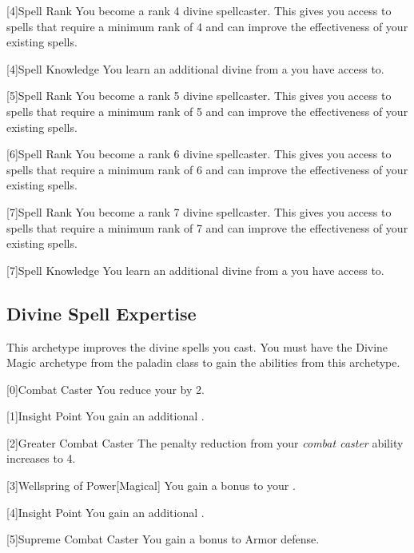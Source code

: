         [4]{Spell Rank} You become a rank 4 divine spellcaster.
        This gives you access to spells that require a minimum rank of 4 and can improve the effectiveness of your existing spells.

        [4]{Spell Knowledge} You learn an additional divine  from a  you have access to.

        [5]{Spell Rank} You become a rank 5 divine spellcaster.
        This gives you access to spells that require a minimum rank of 5 and can improve the effectiveness of your existing spells.

        [6]{Spell Rank} You become a rank 6 divine spellcaster.
        This gives you access to spells that require a minimum rank of 6 and can improve the effectiveness of your existing spells.

        [7]{Spell Rank} You become a rank 7 divine spellcaster.
        This gives you access to spells that require a minimum rank of 7 and can improve the effectiveness of your existing spells.

        [7]{Spell Knowledge} You learn an additional divine  from a  you have access to.

    \newpage
    \subsection{Divine Spell Expertise}
        This archetype improves the divine spells you cast.
        You must have the Divine Magic archetype from the paladin class to gain the abilities from this archetype.

        [0]{Combat Caster} You reduce your  by 2.

        [1]{Insight Point} You gain an additional .

        [2]{Greater Combat Caster} The penalty reduction from your \textit{combat caster} ability increases to 4.

        [3]{Wellspring of Power}[Magical]
        You gain a  bonus to your  .

        [4]{Insight Point} You gain an additional .

        [5]{Supreme Combat Caster} You gain a  bonus to Armor defense.

